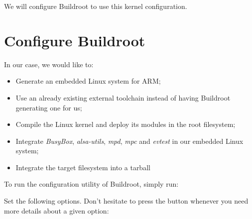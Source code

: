 We will configure Buildroot to use this kernel configuration.

\section{Configure Buildroot}

In our case, we would like to:

\begin{itemize}
\item Generate an embedded Linux system for ARM;
\item Use an already existing external toolchain instead of having
  Buildroot generating one for us;
\item Compile the Linux kernel and deploy its modules in the root
  filesystem;
\item Integrate {\em BusyBox}, {\em alsa-utils},
  {\em mpd}, {\em mpc} and {\em evtest} in our embedded Linux system;
\item Integrate the target filesystem into a tarball
\end{itemize}

To run the configuration utility of Buildroot, simply run:


Set the following options. Don't hesitate to press the 
button whenever you need more details about a given option:

